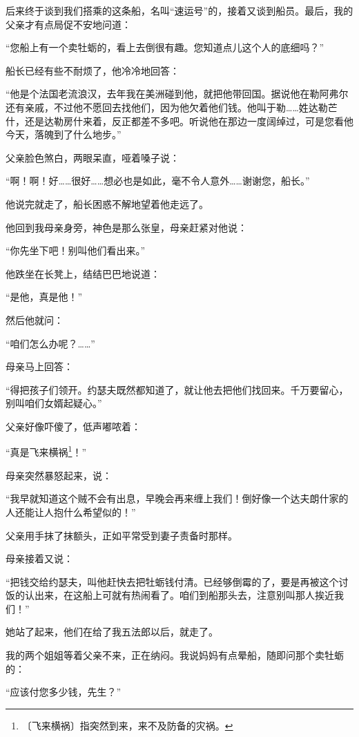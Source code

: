 \documentclass[12pt,UTF-8,openany]{ctexbook}
\begin{document}
\begin{large}
    后来终于谈到我们搭乘的这条船，名叫“速运号”的，接着又谈到船员。最后，我的父亲才有点局促不安地问道：
    
    “您船上有一个卖牡蛎的，看上去倒很有趣。您知道点儿这个人的底细吗？”
    
    船长已经有些不耐烦了，他冷冷地回答：
    
    “他是个法国老流浪汉，去年我在美洲碰到他，就把他带回国。据说他在勒阿弗尔还有亲戚，不过他不愿回去找他们，因为他欠着他们钱。他叫于勒……姓达勒芒什，还是达勒房什来着，反正都差不多吧。听说他在那边一度阔绰过，可是您看他今天，落魄到了什么地步。”
    
    父亲脸色煞白，两眼呆直，哑着嗓子说：
    
    “啊！啊！好……很好……想必也是如此，毫不令人意外……谢谢您，船长。”
    
    他说完就走了，船长困惑不解地望着他走远了。
    
    他回到我母亲身旁，神色是那么张皇，母亲赶紧对他说：
    
    “你先坐下吧！别叫他们看出来。”
    
    他跌坐在长凳上，结结巴巴地说道：
    
    “是他，真是他！”
    
    然后他就问：
    
    “咱们怎么办呢？……”
    
    母亲马上回答：
    
    “得把孩子们领开。约瑟夫既然都知道了，就让他去把他们找回来。千万要留心，别叫咱们女婿起疑心。”
    
    父亲好像吓傻了，低声嘟哝着：
    
    “真是飞来横祸\footnote{〔飞来横祸〕指突然到来，来不及防备的灾祸。}！”
    
    母亲突然暴怒起来，说：
    
    “我早就知道这个贼不会有出息，早晚会再来缠上我们！倒好像一个达夫朗什家的人还能让人抱什么希望似的！”
    
    父亲用手抹了抹额头，正如平常受到妻子责备时那样。
    
    母亲接着又说：
    
    “把钱交给约瑟夫，叫他赶快去把牡蛎钱付清。已经够倒霉的了，要是再被这个讨饭的认出来，在这船上可就有热闹看了。咱们到船那头去，注意别叫那人挨近我们！”
    
    她站了起来，他们在给了我五法郎以后，就走了。
    
    我的两个姐姐等着父亲不来，正在纳闷。我说妈妈有点晕船，随即问那个卖牡蛎的：
    
    “应该付您多少钱，先生？”
    

\end{large}
\end{document}

